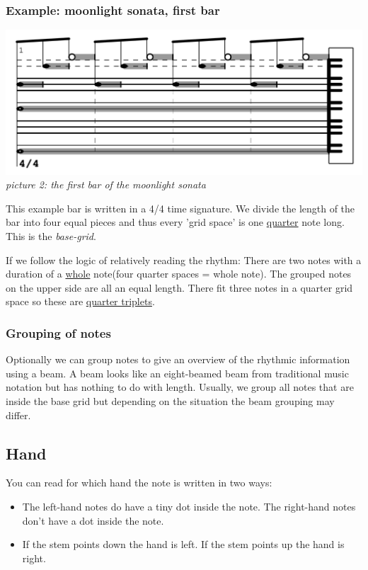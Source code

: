 \documentclass[11pt,a4paper]{article}
\begin{document}
\subsubsection{Example: moonlight sonata, first bar}
\begin{center}
\includegraphics[scale=1]{images/moonlightonebar.jpg}\\
\emph{\small picture 2: the first bar of the moonlight sonata} 
\end{center}

This example bar is written in a 4/4 time signature. We divide the length of the bar into four equal pieces and thus every 'grid space' is one \underline{quarter} note long. This is the \emph{base-grid}.

If we follow the logic of relatively reading the rhythm: There are two notes with a duration of a \underline{whole} note(four quarter spaces = whole note). The grouped notes on the upper side are all an equal length. There fit three notes in a quarter grid space so these are \underline{quarter triplets}.

\subsubsection{Grouping of notes}
Optionally we can group notes to give an overview of the rhythmic information using a beam. A beam looks like an eight-beamed beam from traditional music notation but has nothing to do with length. Usually, we group all notes that are inside the base grid but depending on the situation the beam grouping may differ.

\subsection{Hand}
You can read for which hand the note is written in two ways:
\begin{itemize}
\item{The left-hand notes do have a tiny dot inside the note. The right-hand notes don't have a dot inside the note.}
\item{If the stem points down the hand is left. If the stem points up the hand is right.}
\end{itemize}
\end{document}
